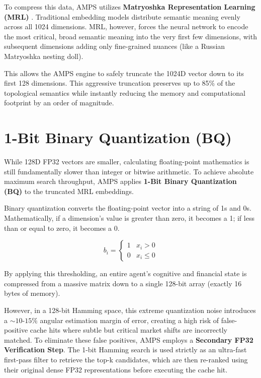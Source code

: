 To compress this data, AMPS utilizes \textbf{Matryoshka Representation Learning (MRL)} \cite{kusupati2022matryoshka}. Traditional embedding models distribute semantic meaning evenly across all 1024 dimensions. MRL, however, forces the neural network to encode the most critical, broad semantic meaning into the very first few dimensions, with subsequent dimensions adding only fine-grained nuances (like a Russian Matryoshka nesting doll).

This allows the AMPS engine to safely truncate the 1024D vector down to its first 128 dimensions. This aggressive truncation preserves up to 85\% of the topological semantics while instantly reducing the memory and computational footprint by an order of magnitude.

\section{1-Bit Binary Quantization (BQ)}

While 128D FP32 vectors are smaller, calculating floating-point mathematics is still fundamentally slower than integer or bitwise arithmetic. To achieve absolute maximum search throughput, AMPS applies \textbf{1-Bit Binary Quantization (BQ)} to the truncated MRL embeddings.

Binary quantization converts the floating-point vector into a string of 1s and 0s. Mathematically, if a dimension's value is greater than zero, it becomes a 1; if less than or equal to zero, it becomes a 0.

\begin{equation}
    b_i = \begin{cases} 
      1 & x_i > 0 \\
      0 & x_i \leq 0 
   \end{cases}
\end{equation}

By applying this thresholding, an entire agent's cognitive and financial state is compressed from a massive matrix down to a single 128-bit array (exactly 16 bytes of memory).

However, in a 128-bit Hamming space, this extreme quantization noise introduces a $\sim 10$-$15\%$ angular estimation margin of error, creating a high risk of false-positive cache hits where subtle but critical market shifts are incorrectly matched. To eliminate these false positives, AMPS employs a \textbf{Secondary FP32 Verification Step}. The 1-bit Hamming search is used strictly as an ultra-fast first-pass filter to retrieve the top-k candidates, which are then re-ranked using their original dense FP32 representations before executing the cache hit.

